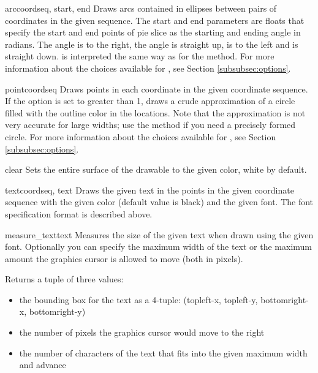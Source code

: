 \begin{methoddesc}{arc}{coordseq, start, end}
Draws arcs contained in ellipses between pairs of coordinates in
the given sequence. The start and end parameters are floats that
specify the start and end points of pie slice as the starting and
ending angle in radians. The angle  is to the right, the angle
 is straight up,  is to the left and
is straight down.  is interpreted the same way as for
the  method.  For more information about the choices
available for , see Section
\ref{subsubsec:options}.
\end{methoddesc}

\begin{methoddesc}{point}{coordseq}
Draws points in each coordinate in the given coordinate sequence. If the 
 option is set to greater than 1, draws a crude approximation 
of a circle filled with the outline color in the locations. Note that
the approximation is not very accurate for large widths; use the
 method if you need a precisely formed circle. 
For more information about the choices
available for , see Section
\ref{subsubsec:options}.
\end{methoddesc}

\begin{methoddesc}{clear}{}
Sets the entire surface of the drawable to the given color, white by 
default.
\end{methoddesc}

\begin{methoddesc}{text}{coordseq, text}
Draws the given text in the points in the given coordinate sequence
with the given color (default value is black) and the given font. The
font specification format is described above.
\end{methoddesc}

\begin{methoddesc}{measure_text}{text}
Measures the size of the given text when drawn using the given
font. Optionally you can specify the maximum width of the text or the
maximum amount the graphics cursor is allowed to move (both in pixels).

Returns a tuple of three values: 
\begin{itemize}
\item the bounding box for the text as a 4-tuple: (topleft-x, topleft-y, bottomright-x, bottomright-y)
\item the number of pixels the graphics cursor would move to the right
\item the number of characters of the text that fits into the given maximum width and advance
\end{itemize}
\end{methoddesc}

